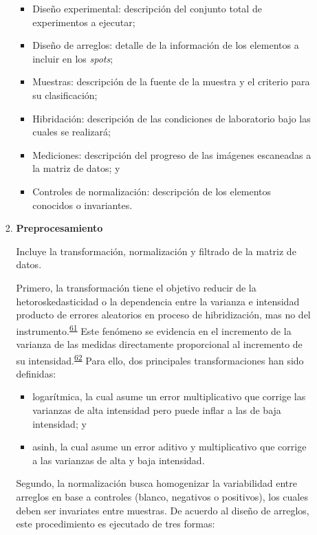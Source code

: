 \documentclass[]{article}
\providecommand{\tightlist}{%
  \setlength{\itemsep}{0pt}\setlength{\parskip}{0pt}}
\begin{document}
\begin{enumerate}
\begin{enumerate}
\begin{enumerate}
      \begin{itemize}
      \tightlist
      \item
        Diseño experimental: descripción del conjunto total de
        experimentos a ejecutar;
      \item
        Diseño de arreglos: detalle de la información de los elementos a
        incluir en los \emph{spots};
      \item
        Muestras: descripción de la fuente de la muestra y el criterio
        para su clasificación;
      \item
        Hibridación: descripción de las condiciones de laboratorio bajo
        las cuales se realizará;
      \item
        Mediciones: descripción del progreso de las imágenes escaneadas
        a la matriz de datos; y
      \item
        Controles de normalización: descripción de los elementos
        conocidos o invariantes.
      \end{itemize}
    \item
      \textbf{Preprocesamiento}

      Incluye la transformación, normalización y filtrado de la matriz
      de datos.

      Primero, la transformación tiene el objetivo reducir de la
      hetoroskedasticidad o la dependencia entre la varianza e
      intensidad producto de errores aleatorios en proceso de
      hibridización, mas no del
      instrumento.\textsuperscript{\protect\hyperlink{ref-kreil2005bullet}{61}}
      Este fenómeno se evidencia en el incremento de la varianza de las
      medidas directamente proporcional al incremento de su
      intensidad.\textsuperscript{\protect\hyperlink{ref-brown2001image}{62}}
      Para ello, dos principales transformaciones han sido definidas:

      \begin{itemize}
      \tightlist
      \item
        logarítmica, la cual asume un error multiplicativo que corrige
        las varianzas de alta intensidad pero puede inflar a las de baja
        intensidad; y
      \item
        asinh, la cual asume un error aditivo y multiplicativo que
        corrige a las varianzas de alta y baja intensidad.
      \end{itemize}

      Segundo, la normalización busca homogenizar la variabilidad entre
      arreglos en base a controles (blanco, negativos o positivos), los
      cuales deben ser invariates entre muestras. De acuerdo al diseño
      de arreglos, este procedimiento es ejecutado de tres formas:


\end{enumerate}
\end{enumerate}
\end{enumerate}
\end{document}
